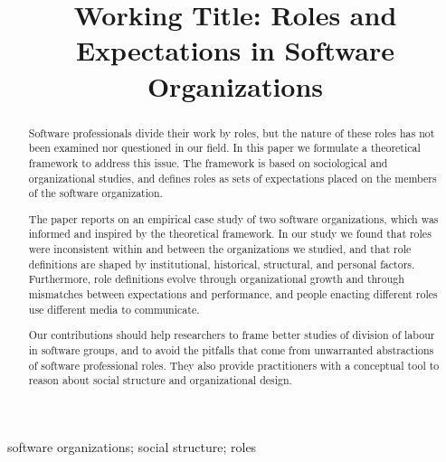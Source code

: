 \documentclass[10pt, conference, compsocconf]{IEEEtran}
\begin{document}
\title{Working Title: Roles and Expectations in Software Organizations}

\author{
}

\maketitle


\begin{abstract}

Software professionals divide their work by roles, but the nature of these roles has not been examined nor questioned in our field. In this paper we formulate a theoretical framework to address this issue. The framework is based on sociological and organizational studies, and defines roles as sets of expectations placed on the members of the software organization.

The paper reports on an empirical case study of two software organizations, which was informed and inspired by the theoretical framework. In our study we found that roles were inconsistent within and between the organizations we studied, and that role definitions are shaped by institutional, historical, structural, and personal factors. Furthermore, role definitions evolve through organizational growth and through mismatches between expectations and performance, and people enacting different roles use different media to communicate.

Our contributions should help researchers to frame better studies of division of labour in software groups, and to avoid the pitfalls that come from unwarranted abstractions of software professional roles. They also provide practitioners with a conceptual tool to reason about social structure and organizational design.

\end{abstract}

\begin{IEEEkeywords}
software organizations; social structure; roles
\end{IEEEkeywords}

\end{document}

